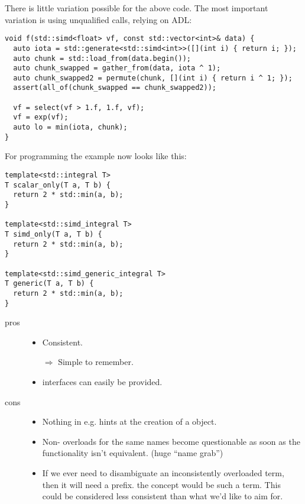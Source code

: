There is little variation possible for the above code.
The most important variation is using unqualified calls, relying on ADL:
\medskip\begin{lstlisting}[style=Vc]
void f(std::simd<float> vf, const std::vector<int>& data) {
  auto iota = std::generate<std::simd<int>>([](int i) { return i; });
  auto chunk = std::load_from(data.begin());
  auto chunk_swapped = gather_from(data, iota ^ 1);
  auto chunk_swapped2 = permute(chunk, [](int i) { return i ^ 1; });
  assert(all_of(chunk_swapped == chunk_swapped2));

  vf = select(vf > 1.f, 1.f, vf);
  vf = exp(vf);
  auto lo = min(iota, chunk);
}
\end{lstlisting}

For \simdgeneric programming the example now looks like this:
\medskip\begin{lstlisting}[style=Vc]
template<std::integral T>
T scalar_only(T a, T b) {
  return 2 * std::min(a, b);
}

template<std::simd_integral T>
T simd_only(T a, T b) {
  return 2 * std::min(a, b);
}

template<std::simd_generic_integral T>
T generic(T a, T b) {
  return 2 * std::min(a, b);
}
\end{lstlisting}

\begin{description}
  \item[pros]
    \begin{itemize}
      \item Consistent.
      \item[$\Rightarrow$] Simple to remember.
      \item \simdgeneric interfaces can easily be provided.
    \end{itemize}

  \item[cons]
    \begin{itemize}
      \item Nothing in e.g.  hints
        at the creation of a \simd object.
      \item Non- overloads for the same names become questionable
        as soon as the functionality isn't equivalent. (huge “name grab”)

      \item If we ever need to disambiguate an inconsistently overloaded term,
        then it will need a  prefix.
        \Eg the  concept would be such a term.
        This could be considered less consistent than what we'd like to aim
        for.
    \end{itemize}
\end{description}

